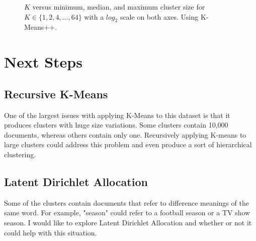 \documentclass{article} %
\begin{document}
\begin{figure}[h]
\begin{center}
\end{center}
\caption{$K$ versus minimum, median, and maximum cluster size for $K \in \{1,2,4,...,64\}$ with a $log_{2}$ scale on both axes. Using K-Means++.}
\end{figure}




\section{Next Steps}

\subsection{Recursive K-Means}

One of the largest issues with applying K-Means to this dataset is that it produces clusters with huge size variations. Some clusters contain 10,000 documents, whereas others contain only one. Recursively applying K-means to large clusters could address this problem and even produce a sort of hierarchical clustering.

\subsection{Latent Dirichlet Allocation}

Some of the clusters contain documents that refer to difference meanings of the same word. For example, "season" could refer to a football season or a TV show season. I would like to explore Latent Dirichlet Allocation and whether or not it could help with this situation.
\end{document}
